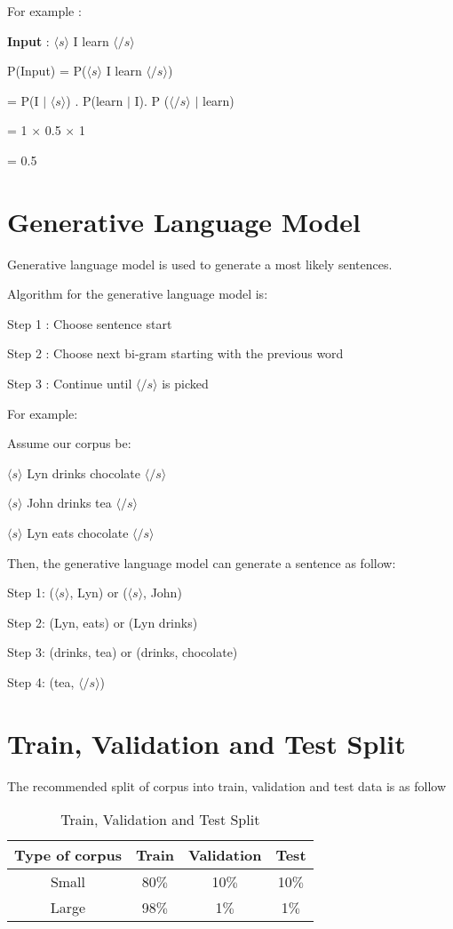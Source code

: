 For example :

\textbf{Input} : $\langle s \rangle$ I learn $\langle /s \rangle$

P(Input) = P($\langle s \rangle$ I learn $\langle /s \rangle$)

= P(I \(|\) $\langle s \rangle$) .  P(learn \(|\) I). P ($\langle /s \rangle$ \(|\) learn)

= 1 $\times$ 0.5 $\times$ 1

= 0.5

\section{Generative Language Model}
Generative language model is used to generate a most likely sentences.

Algorithm for the generative language model is:

Step 1 : Choose sentence start

Step 2 : Choose next bi-gram starting with the previous word

Step 3 : Continue until $\langle /s \rangle$ is picked

For example:

Assume our corpus be:

$\langle s \rangle$ Lyn drinks chocolate $\langle /s \rangle$

$\langle s \rangle$ John drinks tea $\langle /s \rangle$

$\langle s \rangle$ Lyn eats chocolate $\langle /s \rangle$

Then, the generative language model can generate a sentence as follow:

Step 1: \colorbox{green!30}{($\langle s \rangle$, Lyn)} or ($\langle s \rangle$, John)

Step 2: (Lyn, eats) or \colorbox{green!30}{(Lyn drinks)}

Step 3: \colorbox{green!30}{(drinks, tea)} or (drinks, chocolate)

Step 4: \colorbox{green!30}{(tea, $\langle /s \rangle$)}

\section{Train, Validation and Test Split}
The recommended split of corpus into train, validation and test data is as follow

\begin{table}[h]
	\centering
	\begin{tabular}{|c |c |c |c |}
		\hline
		Type of corpus & Train  & Validation & Test   \\
		\hline
		Small          & 80$\%$ & 10$\%$     & 10$\%$ \\
		\hline
		Large          & 98$\%$ & 1$\%$      & 1$\%$  \\
		\hline
	\end{tabular}
	\caption{Train, Validation and Test Split}
	\label{tab:TVT Split}
\end{table}

